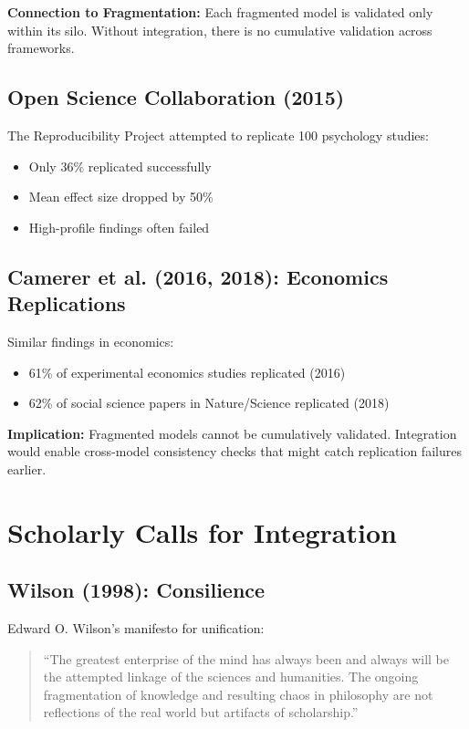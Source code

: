 \documentclass[12pt,a4paper]{article}
\begin{document}
\textbf{Connection to Fragmentation:}
Each fragmented model is validated only within its silo. Without integration, there is no cumulative validation across frameworks.

\subsection{Open Science Collaboration (2015)}

The Reproducibility Project attempted to replicate 100 psychology studies:
\begin{itemize}
\item Only 36\% replicated successfully
\item Mean effect size dropped by 50\%
\item High-profile findings often failed
\end{itemize}

\subsection{Camerer et al. (2016, 2018): Economics Replications}

Similar findings in economics:
\begin{itemize}
\item 61\% of experimental economics studies replicated (2016)
\item 62\% of social science papers in Nature/Science replicated (2018)
\end{itemize}

\textbf{Implication:}
Fragmented models cannot be cumulatively validated. Integration would enable cross-model consistency checks that might catch replication failures earlier.

\section{Scholarly Calls for Integration}
\label{sec:calls}

\subsection{Wilson (1998): Consilience}

Edward O. Wilson's manifesto for unification:
\begin{quote}
``The greatest enterprise of the mind has always been and always will be the attempted linkage of the sciences and humanities. The ongoing fragmentation of knowledge and resulting chaos in philosophy are not reflections of the real world but artifacts of scholarship.''
\end{quote}
\end{document}
